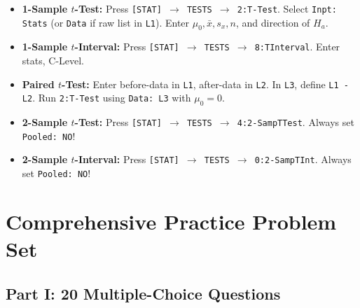 \begin{calculatorbox}
\begin{itemize}[leftmargin=1.2em]
  \item \textbf{1-Sample $t$-Test:} Press \texttt{[STAT] $\rightarrow$ TESTS $\rightarrow$ 2:T-Test}.
  Select \texttt{Inpt: Stats} (or \texttt{Data} if raw list in \texttt{L1}). Enter $\mu_0, \bar{x}, s_x, n$, and direction of $H_a$.
  \item \textbf{1-Sample $t$-Interval:} Press \texttt{[STAT] $\rightarrow$ TESTS $\rightarrow$ 8:TInterval}. Enter stats, C-Level.
  \item \textbf{Paired $t$-Test:} Enter before-data in \texttt{L1}, after-data in \texttt{L2}. In \texttt{L3}, define \texttt{L1 - L2}. Run \texttt{2:T-Test} using \texttt{Data: L3} with $\mu_0 = 0$.
  \item \textbf{2-Sample $t$-Test:} Press \texttt{[STAT] $\rightarrow$ TESTS $\rightarrow$ 4:2-SampTTest}. Always set \texttt{Pooled: NO}!
  \item \textbf{2-Sample $t$-Interval:} Press \texttt{[STAT] $\rightarrow$ TESTS $\rightarrow$ 0:2-SampTInt}. Always set \texttt{Pooled: NO}!
\end{itemize}
\end{calculatorbox}

\section{Comprehensive Practice Problem Set}

\subsection*{Part I: 20 Multiple-Choice Questions}

